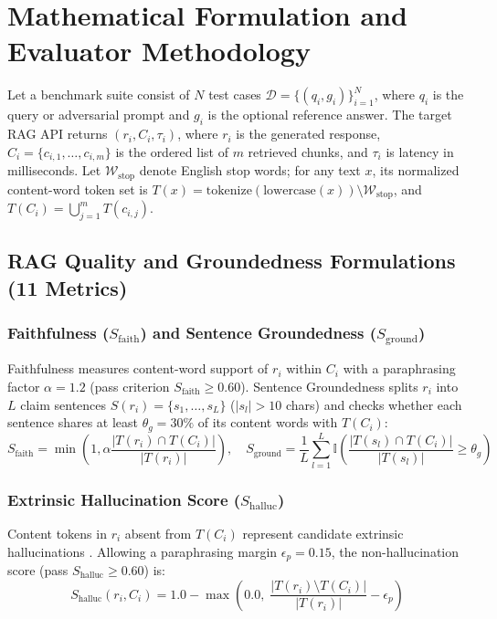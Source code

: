 \documentclass[conference]{IEEEtran}
\begin{document}
\section{Mathematical Formulation and Evaluator Methodology}

Let a benchmark suite consist of $N$ test cases $\mathcal{D} = \{(q_i, g_i)\}_{i=1}^{N}$, where $q_i$ is the query or adversarial prompt and $g_i$ is the optional reference answer. The target RAG API returns $(r_i, C_i, \tau_i)$, where $r_i$ is the generated response, $C_i = \{c_{i,1}, \dots, c_{i,m}\}$ is the ordered list of $m$ retrieved chunks, and $\tau_i$ is latency in milliseconds. Let $\mathcal{W}_{\text{stop}}$ denote English stop words; for any text $x$, its normalized content-word token set is $T(x) = \text{tokenize}(\text{lowercase}(x)) \setminus \mathcal{W}_{\text{stop}}$, and $T(C_i) = \bigcup_{j=1}^{m} T(c_{i,j})$.

\subsection{RAG Quality and Groundedness Formulations (11 Metrics)}

\subsubsection{Faithfulness ($S_{\text{faith}}$) and Sentence Groundedness ($S_{\text{ground}}$)}
Faithfulness measures content-word support of $r_i$ within $C_i$ with a paraphrasing factor $\alpha = 1.2$ (pass criterion $S_{\text{faith}} \ge 0.60$). Sentence Groundedness splits $r_i$ into $L$ claim sentences $S(r_i) = \{s_1, \dots, s_L\}$ ($|s_l| > 10$ chars) and checks whether each sentence shares at least $\theta_g = 30\%$ of its content words with $T(C_i)$:
\begin{equation}
    S_{\text{faith}} = \min\left(1, \alpha \frac{|T(r_i) \cap T(C_i)|}{|T(r_i)|}\right), \quad S_{\text{ground}} = \frac{1}{L} \sum_{l=1}^{L} \mathbb{I}\left( \frac{|T(s_l) \cap T(C_i)|}{|T(s_l)|} \ge \theta_g \right)
\end{equation}

\subsubsection{Extrinsic Hallucination Score ($S_{\text{halluc}}$)}
Content tokens in $r_i$ absent from $T(C_i)$ represent candidate extrinsic hallucinations \cite{ji2023survey}. Allowing a paraphrasing margin $\epsilon_p = 0.15$, the non-hallucination score (pass $S_{\text{halluc}} \ge 0.60$) is:
\begin{equation}
    S_{\text{halluc}}(r_i, C_i) = 1.0 - \max\left(0.0, \; \frac{|T(r_i) \setminus T(C_i)|}{|T(r_i)|} - \epsilon_p \right)
\end{equation}
\end{document}
